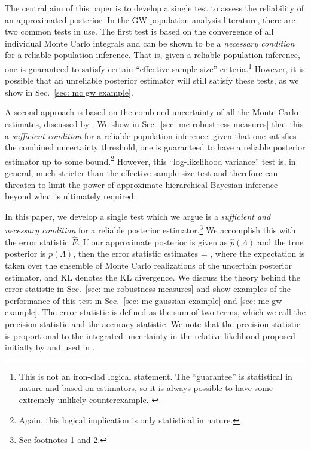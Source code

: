 The central aim of this paper is to develop a single test to assess the reliability of an approximated posterior. In the \ac{GW} population analysis literature, there are two common tests in use. The first test is based on the convergence of all individual Monte Carlo integrals and can be shown to be a \textit{necessary condition} for a reliable population inference. That is, given a reliable population inference, one is guaranteed to satisfy certain ``effective sample size'' criteria.\footnote{This is not an iron-clad logical statement. The ``guarantee'' is statistical in nature and based on estimators, so it is always possible to have some extremely unlikely counterexample. \label{footnote: stat1}} However, it is possible that an unreliable posterior estimator will still satisfy these tests, as we show in Sec.~\ref{sec: mc gw example}.

A second approach is based on the combined uncertainty of all the Monte Carlo estimates, discussed by \citet{Talbot:2023pex}. We show in Sec.~\ref{sec: mc robustness measures} that this a \textit{sufficient condition} for a reliable population inference: given that one satisfies the combined uncertainty threshold, one is guaranteed to have a reliable posterior estimator up to some bound.\footnote{Again, this logical implication is only statistical in nature.\label{footnote: stat2}} However, this ``log-likelihood variance'' test is, in general, much stricter than the effective sample size test and therefore can threaten to limit the power of approximate hierarchical Bayesian inference beyond what is ultimately required. 

In this paper, we develop a single test which we argue is a \textit{sufficient and necessary condition} for a reliable posterior estimator.\footnote{See footnotes \ref{footnote: stat1} and \ref{footnote: stat2}.} We accomplish this with the error statistic $\hat{E}$. If our approximate posterior is given as $\hat{p}(\Lambda)$ and the true posterior is $p(\Lambda)$, then the error statistic estimates
\beq
{} \approx {} = , 
\label{eq: error statistic as kl}
\eeq
where the expectation is taken over the ensemble of Monte Carlo realizations of the uncertain posterior estimator, and $\mathrm{KL}$ denotes the \ac{KL} divergence. We discuss the theory behind the error statistic in Sec.~\ref{sec: mc robustness measures} and show examples of the performance of this test in Sec.~\ref{sec: mc gaussian example} and \ref{sec: mc gw example}.
The error statistic is defined as the sum of two terms, which we call the precision statistic and the accuracy statistic. We note that the precision statistic is proportional to the integrated uncertainty in the relative likelihood proposed initially by \citet{Essick:2022ojx} and used in \citet{Talbot:2023pex}. 


